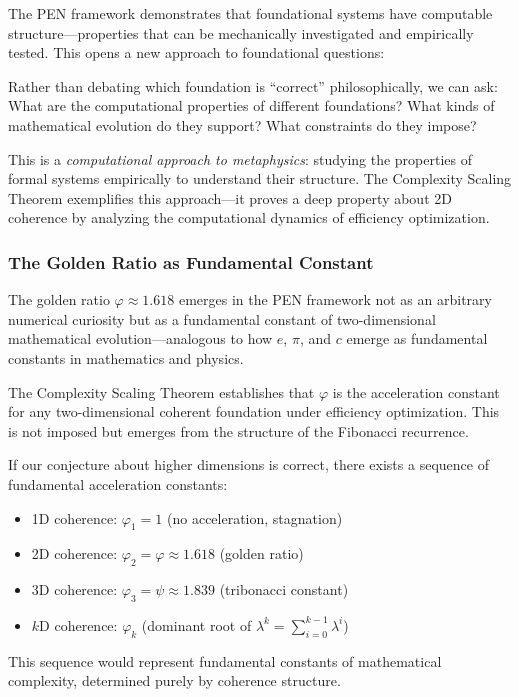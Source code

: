 \documentclass[11pt]{article}
\theoremstyle{definition}
\theoremstyle{remark}
\begin{document}
The PEN framework demonstrates that foundational systems have computable structure---properties
that can be mechanically investigated and empirically tested. This opens a new approach to foundational
questions:

Rather than debating which foundation is ``correct'' philosophically, we can ask: What are the
computational properties of different foundations? What kinds of mathematical evolution do they
support? What constraints do they impose?

This is a \emph{computational approach to metaphysics}: studying the properties of formal systems
empirically to understand their structure. The Complexity Scaling Theorem exemplifies this approach---it
proves a deep property about 2D coherence by analyzing the computational dynamics of efficiency
optimization.

\subsubsection{The Golden Ratio as Fundamental Constant}

The golden ratio $\varphi \approx 1.618$ emerges in the PEN framework not as an arbitrary numerical
curiosity but as a fundamental constant of two-dimensional mathematical evolution---analogous to
how $e$, $\pi$, and $c$ emerge as fundamental constants in mathematics and physics.

The Complexity Scaling Theorem establishes that $\varphi$ is the acceleration constant for any
two-dimensional coherent foundation under efficiency optimization. This is not imposed but emerges
from the structure of the Fibonacci recurrence.

If our conjecture about higher dimensions is correct, there exists a sequence of fundamental
acceleration constants:
\begin{itemize}
\item 1D coherence: $\varphi_1 = 1$ (no acceleration, stagnation)
\item 2D coherence: $\varphi_2 = \varphi \approx 1.618$ (golden ratio)
\item 3D coherence: $\varphi_3 = \psi \approx 1.839$ (tribonacci constant)
\item $k$D coherence: $\varphi_k$ (dominant root of $\lambda^k = \sum_{i=0}^{k-1} \lambda^i$)
\end{itemize}

This sequence would represent fundamental constants of mathematical complexity, determined purely
by coherence structure.
\end{document}
